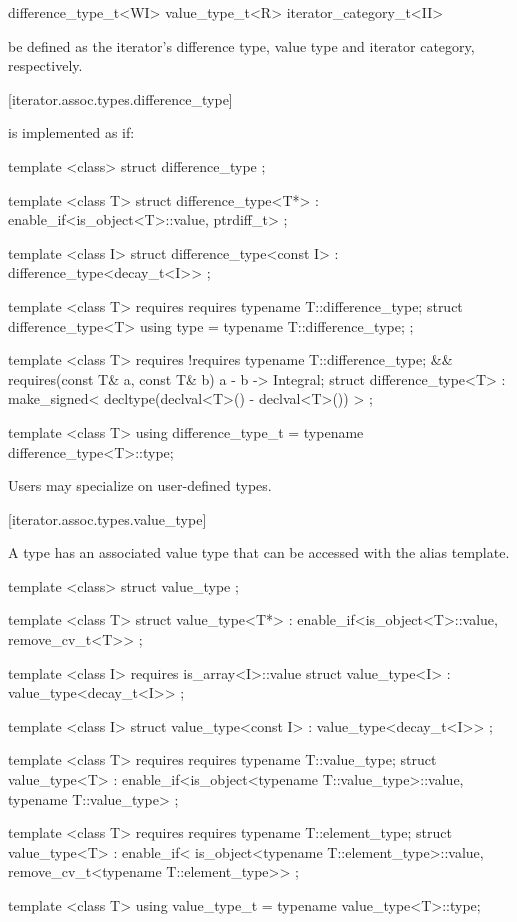 \begin{codeblock}
difference_type_t<WI>
value_type_t<R>
iterator_category_t<II>
\end{codeblock}

be defined as the iterator's difference type, value type and iterator category, respectively.

[iterator.assoc.types.difference_type]{}

\pnum
{}%
 is implemented as if:

%
\begin{codeblock}
  template <class> struct difference_type { };

  template <class T>
  struct difference_type<T*>
    : enable_if<is_object<T>::value, ptrdiff_t> { };

  template <class I>
  struct difference_type<const I> : difference_type<decay_t<I>> { };

  template <class T>
    requires requires { typename T::difference_type; }
  struct difference_type<T> {
    using type = typename T::difference_type;
  };

  template <class T>
    requires !requires { typename T::difference_type; } &&
      requires(const T& a, const T& b) { { a - b } -> Integral; }
  struct difference_type<T>
    : make_signed< decltype(declval<T>() - declval<T>()) > {
  };

  template <class T> using difference_type_t
    = typename difference_type<T>::type;
\end{codeblock}

\pnum
Users may specialize  on user-defined types.

[iterator.assoc.types.value_type]{}

\pnum
A  type has an associated value type that can be accessed with the
 alias template.

%
\begin{codeblock}
  template <class> struct value_type { };

  template <class T>
  struct value_type<T*>
    : enable_if<is_object<T>::value, remove_cv_t<T>> { };

  template <class I>
    requires is_array<I>::value
  struct value_type<I> : value_type<decay_t<I>> { };

  template <class I>
  struct value_type<const I> : value_type<decay_t<I>> { };

  template <class T>
    requires requires { typename T::value_type; }
  struct value_type<T>
    : enable_if<is_object<typename T::value_type>::value, typename T::value_type> { };

  template <class T>
    requires requires { typename T::element_type; }
  struct value_type<T>
    : enable_if<
        is_object<typename T::element_type>::value,
        remove_cv_t<typename T::element_type>>
    { };

  template <class T> using value_type_t
    = typename value_type<T>::type;
\end{codeblock}

